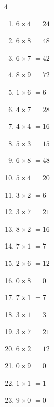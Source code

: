 \begin{multicols}{4}
\begin{enumerate}
  \item $6\times 4$
        $=24$

  \item $6\times 8$
        $=48$

  \item $6\times 7$
        $=42$

  \item $8\times 9$
        $=72$

  \item $1\times 6$
        $=6$

  \item $4\times 7$
        $=28$

  \item $4\times 4$
        $=16$

  \item $5\times 3$
        $=15$

  \item $6\times 8$
        $=48$

  \item $5\times 4$
        $=20$

  \item $3\times 2$
        $=6$

  \item $3\times 7$
        $=21$

  \item $8\times 2$
        $=16$

  \item $7\times 1$
        $=7$

  \item $2\times 6$
        $=12$

  \item $0\times 8$
        $=0$

  \item $7\times 1$
        $=7$

  \item $3\times 1$
        $=3$

  \item $3\times 7$
        $=21$

  \item $6\times 2$
        $=12$

  \item $0\times 9$
        $=0$

  \item $1\times 1$
        $=1$

  \item $9\times 0$
        $=0$


\end{enumerate}
\end{multicols}
